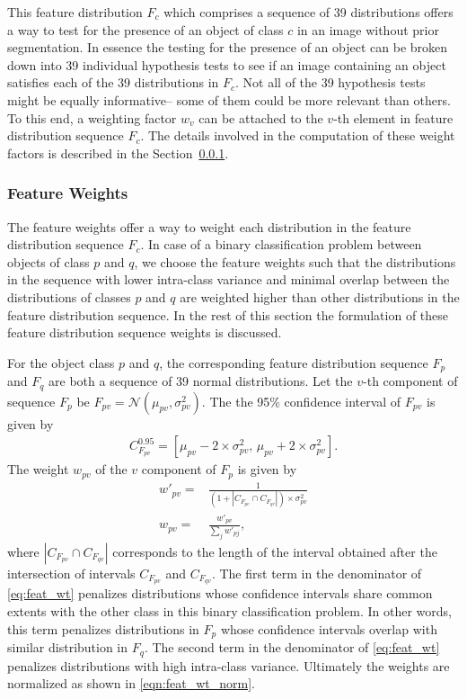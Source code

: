 \documentclass {udthesis}
\begin{document}
This feature distribution $F_c$ which comprises a sequence of 39 distributions offers a way to test for the presence of an object of class $c$ in an image without prior segmentation. In essence the testing for the presence of an object can be broken down into 39 individual hypothesis tests to see if an image containing an object satisfies each of the 39 distributions in $F_c$. Not all of the 39 hypothesis tests might be equally informative-- some of them could be more relevant than others. To this end, a weighting factor $w_{v}$ can be attached to the $v$-th element in feature distribution sequence $F_c$.  The details involved in the computation of these weight factors is described in the Section~\ref{sec:feat_wts}.

\subsubsection{Feature Weights}
\label{sec:feat_wts}

The feature weights offer a way to weight each distribution in the feature distribution sequence $F_c$. In case of a binary classification problem between objects of class $p$ and $q$, we choose the feature weights such that the distributions in the sequence with lower intra-class variance and minimal overlap between the distributions of classes $p$ and $q$ are weighted higher than other distributions in the feature distribution sequence. In the rest of this section the formulation of these feature distribution sequence weights is discussed.

For the object class $p$ and $q$, the corresponding feature distribution sequence $F_p$ and $F_q$ are both a sequence of 39 normal distributions. Let the $v$-th component of sequence $F_p$ be $F_{pv}=\mathcal{N}(\mu_{pv},\sigma^2_{pv})$.
The the 95\% confidence interval of $F_{pv}$ is given by
%
\begin{align}	\label{eqn:conf_interval}
C^{0.95}_{F_{pv}}=[\mu_{pv}-2 \times \sigma^2_{pv},\, \mu_{pv}+2 \times \sigma^2_{pv}].
\end{align}
%
The weight $w_{pv}$ of the $v$ component of $F_p$ is given by
\begin{align}
 w'_{pv}= & \frac{1}{(1+ |C_{F_{pv}} \cap C_{F_{qv}}| )\times \sigma^2_{pv}} \label{eq:feat_wt}\\
 w_{pv}= & \frac{w'_{pv}}{\sum_{j} w'_{pj}}, \label{eqn:feat_wt_norm}
\end{align}
where $|C_{F_{pv}} \cap C_{F_{qv}}|$ corresponds to the length of the interval obtained after the intersection of intervals $C_{F_{pv}}$ and $C_{F_{qv}}$. The first term in the denominator of \eqref{eq:feat_wt} penalizes distributions whose confidence intervals share common extents with the other class in this binary classification problem. In other words, this term penalizes distributions in $F_p$ whose confidence intervals overlap with similar  distribution in $F_q$. The second term in the denominator of \eqref{eq:feat_wt} penalizes distributions with high intra-class variance. Ultimately the weights are normalized as shown in \eqref{eqn:feat_wt_norm}.
\end{document}
